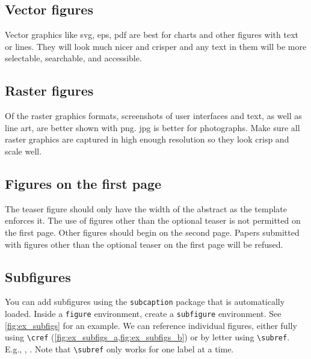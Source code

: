 \documentclass[journal]{vgtc}                %
\begin{document}
\subsection{Vector figures}

Vector graphics like svg, eps, pdf are best for charts and other figures with text or lines.
They will look much nicer and crisper and any text in them will be more selectable, searchable, and accessible.

\subsection{Raster figures}

Of the raster graphics formats, screenshots of user interfaces and text, as well as line art, are better shown with png.
jpg is better for photographs.
Make sure all raster graphics are captured in high enough resolution so they look crisp and scale well.

\subsection{Figures on the first page}

The teaser figure should only have the width of the abstract as the template enforces it.
The use of figures other than the optional teaser is not permitted on the first page.
Other figures should begin on the second page.
Papers submitted with figures other than the optional teaser on the first page will be refused.

\subsection{Subfigures}

You can add subfigures using the \texttt{subcaption} package that is automatically loaded.
Inside a \verb|figure| environment, create a \verb|subfigure| environment.
See \cref{fig:ex_subfigs} for an example.
We can reference individual figures, either fully using \verb|\cref| (\cref{fig:ex_subfigs_a,fig:ex_subfigs_b}) or by letter using \verb|\subref|.
E.g., , .
Note that \verb|\subref| only works for one label at a time.
\end{document}
